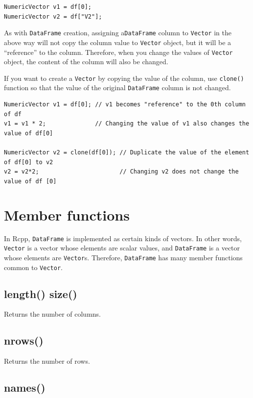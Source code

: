 \documentclass[]{book}
\theoremstyle{definition}
\theoremstyle{definition}
\theoremstyle{remark}
\begin{document}
\begin{verbatim}
NumericVector v1 = df[0];
NumericVector v2 = df["V2"];
\end{verbatim}

As with \texttt{DataFrame} creation, assigning a\texttt{DataFrame}
column to \texttt{Vector} in the above way will not copy the column
value to \texttt{Vector} object, but it will be a ``reference'' to the
column. Therefore, when you change the values of \texttt{Vector} object,
the content of the column will also be changed.

If you want to create a \texttt{Vector} by copying the value of the
column, use \texttt{clone()} function so that the value of the original
\texttt{DataFrame} column is not changed.

\begin{verbatim}
NumericVector v1 = df[0]; // v1 becomes "reference" to the 0th column of df
v1 = v1 * 2;              // Changing the value of v1 also changes the value of df[0]

NumericVector v2 = clone(df[0]); // Duplicate the value of the element of df[0] to v2
v2 = v2*2;                       // Changing v2 does not change the value of df [0]
\end{verbatim}

\section{Member functions}\label{member-functions-2}

In Rcpp, \texttt{DataFrame} is implemented as certain kinds of vectors.
In other words, \texttt{Vector} is a vector whose elements are scalar
values, and \texttt{DataFrame} is a vector whose elements are
\texttt{Vector}s. Therefore, \texttt{DataFrame} has many member
functions common to \texttt{Vector}.

\subsection{length() size()}\label{length-size-1}

Returns the number of columns.

\subsection{nrows()}\label{nrows}

Returns the number of rows.

\subsection{names()}\label{names-1}
\end{document}
